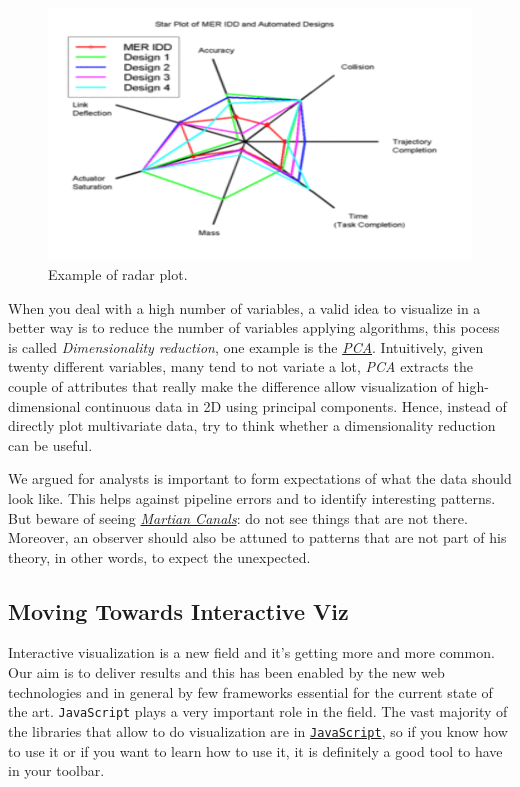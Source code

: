 \begin{itemize}
\begin{itemize}
\begin{figure}[h]%
 \centering
 \includegraphics[width=13cm]{./img/06/radar}
 \caption{\label{pic:radar} Example of radar plot.}
\end{figure}
\end{itemize}
\end{itemize}


When you deal with a high number of variables, a valid idea to visualize in a better way is to reduce the number of variables applying algorithms, this pocess is called \emph{Dimensionality reduction}, one example is the \href{https://en.wikipedia.org/wiki/Principal\_component\_analysis}{ \emph{PCA}}. Intuitively, given twenty different variables, many tend to not variate a lot, \emph{PCA} extracts the couple of attributes that really make the difference allow visualization of high-dimensional continuous data in 2D using principal components. Hence, instead of directly plot multivariate data, try to think whether a dimensionality reduction can be useful.

We argued for analysts is important to form expectations of what the data should look like. This helps against pipeline errors and to identify interesting patterns. But beware of seeing \href{https://en.wikipedia.org/wiki/Martian1_canal}{\emph{Martian Canals}}: do not see things that are not there. Moreover, an observer should also be attuned to patterns that are not part of his theory, in other words, to expect the unexpected. 


\subsection{Moving Towards Interactive Viz}

Interactive visualization is a new field and it's getting more and more common. Our aim is to deliver results and this has been enabled by the new web technologies and in general by few frameworks essential for the current state of the art. \texttt{JavaScript} plays a very important role in the field. The vast majority of the libraries that allow to do visualization are in \href{https://www.codecademy.com/learn/javascript}{\texttt{JavaScript}}, so if you know how to use it or if you want to learn how to use it, it is definitely a good tool to have in your toolbar. 

